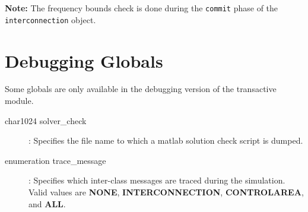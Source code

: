 \textbf{Note:} The frequency bounds check is done during the \texttt{commit} phase of the \texttt{interconnection} object.

\section{Debugging Globals}

Some globals are only available in the debugging version of the transactive module.

\begin{description}

\item[char1024 solver\_check]: Specifies the file name to which a matlab solution check script is dumped.  

\item[enumeration trace\_message]: Specifies which inter-class messages are traced during the simulation. Valid values are \textbf{NONE}, \textbf{INTERCONNECTION}, \textbf{CONTROLAREA}, and \textbf{ALL}.

\end{description}
